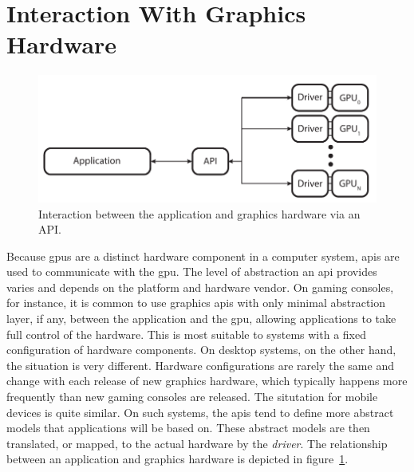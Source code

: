  \section{Interaction With Graphics Hardware}
  \label{sec:HardwareInteraction}
    \begin{figure}
      \centering
      \includegraphics[width=\textwidth]{Main/Images/Application_API_Driver_Overview}
      \caption{Interaction between the application and graphics hardware via an API.}
      \label{fig:AppApiDriverOverview}
    \end{figure}

    Because \glspl{gpu} are a distinct hardware component in a computer system, \glspl{api} are used to communicate with the \gls{gpu}.
    The level of abstraction an \gls{api} provides varies and depends on the platform and hardware vendor.
    On gaming consoles, for instance, it is common to use graphics \glspl{api} with only minimal abstraction layer, if any, between the application and the \gls{gpu}, allowing applications to take full control of the hardware.
    This is most suitable to systems with a fixed configuration of hardware components.
    On desktop systems, on the other hand, the situation is very different.
    Hardware configurations are rarely the same and change with each release of new graphics hardware, which typically happens more frequently than new gaming consoles are released.
    The situtation for mobile devices is quite similar.
    On such systems, the \glspl{api} tend to define more abstract models that applications will be based on.
    These abstract models are then translated, or mapped, to the actual hardware by the \textit{driver}.
    The relationship between an application and graphics hardware is depicted in figure~\ref{fig:AppApiDriverOverview}.


